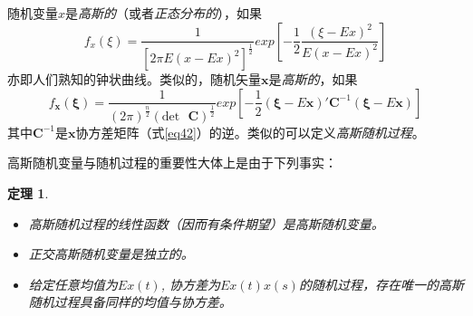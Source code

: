 \documentclass[UTF8,adobefonts]{ctexart}
\newtheorem{theorem}{定理}
\begin{document}
随机变量$x$是\emph{高斯的}（或者\emph{正态分布的}），如果
\begin{equation*}
f_x(\xi)=\frac{1}{[2 \pi E(x-Ex)^2]^{\frac{1}{2}}}exp[-\frac{1}{2}\frac{(\xi-Ex)^2}{E(x-Ex)^2}]
\end{equation*}
亦即人们熟知的钟状曲线。类似的，随机矢量$\mathbf{x}$是\emph{高斯的}，如果
\begin{equation*}
f_{\mathbf{x}}(\mathbf{\xi})=\frac{1}{(2\pi)^{\frac{n}{2}}(\mathrm{det}\text{ }\mathbf{C})^{\frac{1}{2}}}exp[-\frac{1}{2}(\mathbf{\xi}-E\mathbf{x})'\mathbf{C}^{-1}(\mathbf{\xi}-E\mathbf{x})]
\end{equation*}
其中$\mathbf{C}^{-1}$是$\mathbf{x}$协方差矩阵（式\ref{eq42}）的逆。类似的可以定义\emph{高斯随机过程}。

高斯随机变量与随机过程的重要性大体上是由于下列事实：
\begin{theorem}
\label{th5}
\begin{itemize}
\item[A] 高斯随机过程的线性函数（因而有条件期望）是高斯随机变量。
\item[B] 正交高斯随机变量是独立的。
\item[C] 给定任意均值为$Ex(t)$, 协方差为$Ex(t)x(s)$的随机过程，存在唯一的高斯随机过程具备同样的均值与协方差。
\end{itemize}
\end{theorem}
\end{document}
